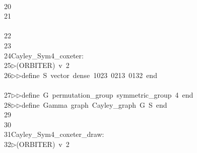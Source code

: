 \begin{tabbing}
\>\\[0pt]
20\>\ \\[0pt]
21\>\\[0pt]
\>\\[0pt]
22\>\\[0pt]
23\>\\[0pt]
24\>Cayley\_Sym4\_coxeter:\\[0pt]
25\>$\triangleright$\>(ORBITER)\ v\ 2\ \\[0pt]
26\>$\triangleright$\>$\triangleright$\>define\ S\ vector\ dense\ 1023\ 0213\ 0132\ end\\[0pt]
\>\ \\[0pt]
27\>$\triangleright$\>$\triangleright$\>define\ G\ permutation\_group\ symmetric\_group\ 4\ end\ \\[0pt]
28\>$\triangleright$\>$\triangleright$\>define\ Gamma\ graph\ Cayley\_graph\ G\ S\ end\ \\[0pt]
29\>\\[0pt]
30\>\\[0pt]
31\>Cayley\_Sym4\_coxeter\_draw:\\[0pt]
32\>$\triangleright$\>(ORBITER)\ v\ 2\ \\[0pt]

\end{tabbing}

